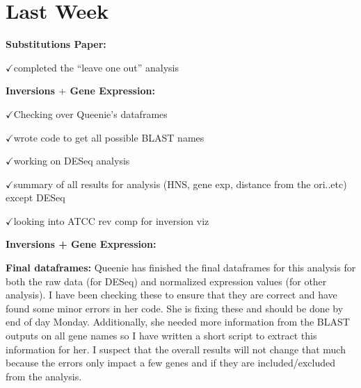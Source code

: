 \documentclass[12pt]{article}
\newcommand{\ch}{$\checkmark$}
\begin{document}

	
\section*{Last Week}
\textbf{Substitutions Paper:}

\ch completed the ``leave one out'' analysis

\textbf{Inversions $+$ Gene Expression:}

\ch Checking over Queenie's dataframes

\ch wrote code to get all possible BLAST names

\ch working on DESeq analysis

\ch summary of all results for analysis (HNS, gene exp, distance from the ori..etc) except DESeq

\ch looking into ATCC rev comp for inversion viz

\bigskip

\textbf{Inversions + Gene Expression:}

\textbf{Final dataframes:}
Queenie has finished the final dataframes for this analysis for both the raw data (for DESeq) and normalized expression values (for other analysis).
I have been checking these to ensure that they are correct and have found some minor errors in her code.
She is fixing these and should be done by end of day Monday.
Additionally, she needed more information from the BLAST outputs on all gene names so I have written a short script to extract this information for her.
I suspect that the overall results will not change that much because the errors only impact a few genes and if they are included/excluded from the analysis.
\end{document}
